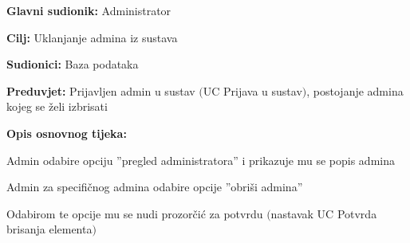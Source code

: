 \noindent {}
\begin{packed_item}

	\item \textbf{Glavni sudionik: } Administrator
	\item  \textbf{Cilj:} Uklanjanje admina iz sustava
	\item  \textbf{Sudionici:} Baza podataka
	\item  \textbf{Preduvjet:} Prijavljen admin u sustav $($UC Prijava u sustav$)$, postojanje
	admina kojeg se želi izbrisati
	\item  \textbf{Opis osnovnog tijeka:}
	
	\item[] \begin{packed_enum}

		\item Admin odabire opciju ”pregled administratora” i prikazuje mu se popis admina
		\item Admin za specifičnog admina odabire opcije ”obriši admina”
		\item Odabirom te opcije mu se nudi prozorčić za potvrdu $($nastavak UC Potvrda brisanja elementa$)$
	\end{packed_enum}
	
\end{packed_item}

